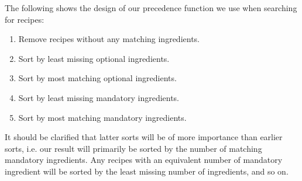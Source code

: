  The following shows the design of our precedence function we use when searching for recipes:
\begin{enumerate}
	\item Remove recipes without any matching ingredients.
	\item Sort by least missing optional ingredients.
	\item Sort by most matching optional ingredients.
	\item Sort by least missing mandatory ingredients.
	\item Sort by most matching mandatory ingredients.
\end{enumerate}
It should be clarified that latter sorts will be of more importance than earlier sorts, i.e. our result will primarily be sorted by the number of matching mandatory ingredients. Any recipes with an equivalent number of mandatory ingredient will be sorted by the least missing number of ingredients, and so on.